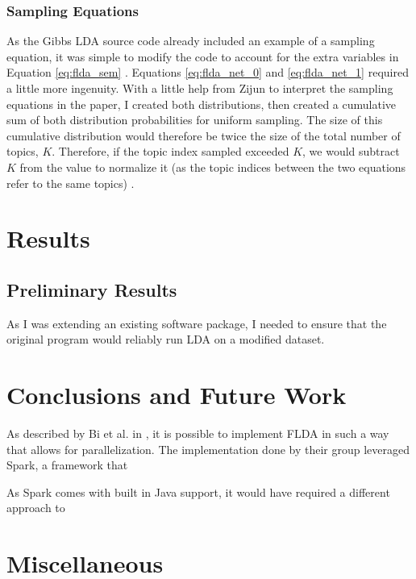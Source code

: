 \documentclass[a4paper]{article}
\begin{document}
\subsubsection{Sampling Equations}
As the Gibbs LDA source code already included an example of a sampling equation, it was simple to modify the code to account for the extra variables in Equation \ref{eq:flda_sem} \cite{gibbs_lda}. Equations \ref{eq:flda_net_0} and \ref{eq:flda_net_1} required a little more ingenuity. With a little help from Zijun to interpret the sampling equations in the paper, I created both distributions, then created a cumulative sum of both distribution probabilities for uniform sampling. The size of this cumulative distribution would therefore be twice the size of the total number of topics, $K$. Therefore, if the topic index sampled exceeded $K$, we would subtract $K$ from the value to normalize it (as the topic indices between the two equations refer to the same topics) \cite{flda}.

\section{Results}
\label{sec:results}
\subsection{Preliminary Results}
As I was extending an existing software package, I needed to ensure that the original program would reliably run LDA on a modified dataset.


\section{Conclusions and Future Work}
\label{sec:conc}

As described by Bi et al. in \cite{flda}, it is possible to implement FLDA in such a way that allows for parallelization. The implementation done by their group leveraged Spark, a framework that 

As Spark comes with built in Java support, it would have required a different approach to 

\section{Miscellaneous}
\label{sec:misc}
\end{document}
